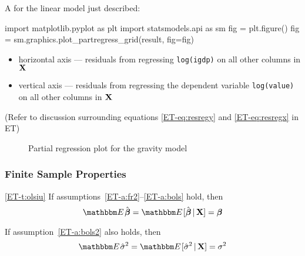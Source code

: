 \begin{frame}[fragile]

    \vspace{2em}
    A  for the linear model just described:
    
    \begin{pythoncode}
import matplotlib.pyplot as plt
import statsmodels.api as sm
fig = plt.figure()
fig = sm.graphics.plot_partregress_grid(result, fig=fig)
    \end{pythoncode}
    
    \begin{itemize}
    \item   horizontal axis --- residuals from regressing 
            \texttt{log(igdp)} on all other
            columns in $\mathbf X$
    \item   vertical axis --- residuals from regressing the dependent variable
            \texttt{log(value)} on all other
            columns in $\mathbf X$
    \end{itemize}
    
    \vspace{.7em}
    (Refer to  discussion surrounding equations \eqref{ET-eq:resregy}
    and \eqref{ET-eq:resregx} in ET)
    
\end{frame}

\begin{frame}

    \begin{figure}
    \caption{\label{f:partial_reg_plot} Partial regression plot for the
    gravity model}
    \end{figure}

\end{frame}

\begin{frame}\frametitle{Finite Sample Properties}

    \vspace{2em}
    \Thm\eqref{ET-t:olsiu}
        If assumptions~\ref{ET-a:fr2}--\ref{ET-a:bols} hold, then 
        \begin{equation}
            \label{eq:hbub}
            \EE \hboldbeta = \EE [\hboldbeta \given \boldX] = \boldbeta
        \end{equation}
        
        If assumption~\ref{ET-a:bols2} also holds, then
        \begin{equation}
            \label{eq:sbub}
          \EE  \hat \sigma^2  = \EE [ \hat \sigma^2 \given \boldX ] = \sigma^2
        \end{equation}
        
\end{frame}

